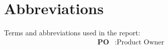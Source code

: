 \chapter*{Abbreviations}
Terms and abbreviations used in the report:
\begin{align*}
    \textbf{PO} &: \text{Product Owner} \\
\end{align*}
